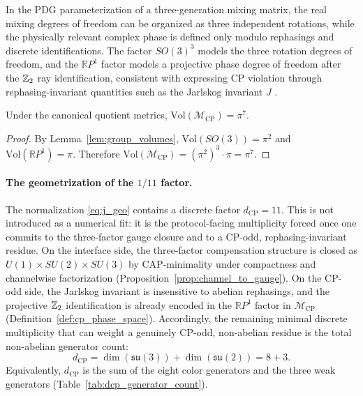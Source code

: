 \begin{remark}\label{rem:cp_phase_space_structure}
In the PDG parameterization of a three-generation mixing matrix, the real mixing degrees of freedom can be organized as three independent rotations, while the physically relevant complex phase is defined only modulo rephasings and discrete identifications.
The factor $SO(3)^3$ models the three rotation degrees of freedom, and the $\mathbb{R}P^1$ factor models a projective phase degree of freedom after the $\mathbb{Z}_2$ ray identification, consistent with expressing CP violation through rephasing-invariant quantities such as the Jarlskog invariant $J$ \cite{Jarlskog1985,PDGRPP2024,Nakahara2003}.
\end{remark}
\begin{lemma}\label{lem:cp_volume_pi7}
Under the canonical quotient metrics, $\mathrm{Vol}(\mathcal{M}_{\mathrm{CP}})=\pi^7$.
\end{lemma}
\begin{proof}
By Lemma~\ref{lem:group_volumes}, $\mathrm{Vol}(SO(3))=\pi^2$ and $\mathrm{Vol}(\mathbb{R}P^1)=\pi$.
Therefore $\mathrm{Vol}(\mathcal{M}_{\mathrm{CP}})=(\pi^2)^3\cdot \pi=\pi^7$.
\end{proof}

\paragraph{The geometrization of the \texorpdfstring{$1/11$}{1/11} factor.}
The normalization \eqref{eq:j_geo} contains a discrete factor $d_{\mathrm{CP}}=11$.
This is not introduced as a numerical fit: it is the protocol-facing multiplicity forced once one commits to the three-factor gauge closure and to a CP-odd, rephasing-invariant residue.
On the interface side, the three-factor compensation structure is closed as $U(1)\times SU(2)\times SU(3)$ by CAP-minimality under compactness and channelwise factorization (Proposition~\ref{prop:channel_to_gauge}).
On the CP-odd side, the Jarlskog invariant is insensitive to abelian rephasings, and the projective $\mathbb{Z}_2$ identification is already encoded in the $\mathbb{R}P^1$ factor in $\mathcal{M}_{\mathrm{CP}}$ (Definition~\ref{def:cp_phase_space}).
Accordingly, the remaining minimal discrete multiplicity that can weight a genuinely CP-odd, non-abelian residue is the total non-abelian generator count:
\[
d_{\mathrm{CP}}=\dim(\mathfrak{su}(3))+\dim(\mathfrak{su}(2))=8+3.
\]
Equivalently, $d_{\mathrm{CP}}$ is the sum of the eight color generators and the three weak generators (Table~\ref{tab:dcp_generator_count}).

